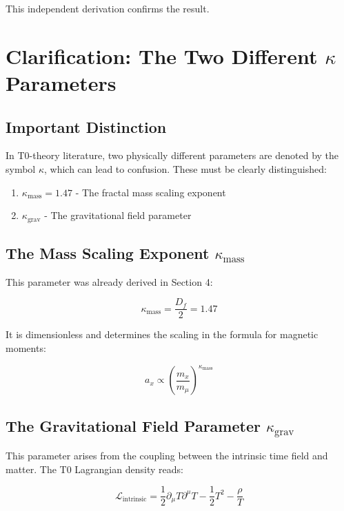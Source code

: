\documentclass[12pt,a4paper]{article}
\begin{document}
	This independent derivation confirms the result.
	
	\section{Clarification: The Two Different $\kappa$ Parameters}
	
	\subsection{Important Distinction}
	
	In T0-theory literature, two physically different parameters are denoted by the symbol $\kappa$, which can lead to confusion. These must be clearly distinguished:
	
	\begin{enumerate}
		\item $\kappa_{\text{mass}} = 1.47$ - The fractal mass scaling exponent
		\item $\kappa_{\text{grav}}$ - The gravitational field parameter
	\end{enumerate}
	
	\subsection{The Mass Scaling Exponent $\kappa_{\text{mass}}$}
	
	This parameter was already derived in Section 4:
	
	\begin{equation}
		\kappa_{\text{mass}} = \frac{D_f}{2} = 1.47
	\end{equation}
	
	It is dimensionless and determines the scaling in the formula for magnetic moments:
	
	\begin{equation}
		a_x \propto \left(\frac{m_x}{m_\mu}\right)^{\kappa_{\text{mass}}}
	\end{equation}
	
	\subsection{The Gravitational Field Parameter $\kappa_{\text{grav}}$}
	
	This parameter arises from the coupling between the intrinsic time field and matter. The T0 Lagrangian density reads:
	
	\begin{equation}
		\mathcal{L}_{\text{intrinsic}} = \frac{1}{2}\partial_\mu T \partial^\mu T - \frac{1}{2}T^2 - \frac{\rho}{T}
	\end{equation}
	
\end{document}
